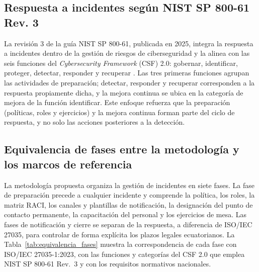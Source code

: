 \subsection{Respuesta a incidentes según NIST SP 800-61 Rev. 3}
La revisión 3 de la guía NIST SP 800-61, publicada en 2025, integra la respuesta a incidentes dentro de la gestión de riesgos de ciberseguridad y la alinea con las seis funciones del \textit{Cybersecurity Framework} (CSF) 2.0: gobernar, identificar, proteger, detectar, responder y recuperar \cite{nist80061r3,nistcsf2024}. Las tres primeras funciones agrupan las actividades de preparación; detectar, responder y recuperar corresponden a la respuesta propiamente dicha, y la mejora continua se ubica en la categoría de mejora de la función identificar. Este enfoque refuerza que la preparación (políticas, roles y ejercicios) y la mejora continua forman parte del ciclo de respuesta, y no solo las acciones posteriores a la detección.

\subsection{Equivalencia de fases entre la metodología y los marcos de referencia}
La metodología propuesta organiza la gestión de incidentes en siete fases. La fase de preparación precede a cualquier incidente y comprende la política, los roles, la matriz RACI, los canales y plantillas de notificación, la designación del punto de contacto permanente, la capacitación del personal y los ejercicios de mesa. Las fases de notificación y cierre se separan de la respuesta, a diferencia de ISO/IEC 27035, para controlar de forma explícita los plazos legales ecuatorianos. La Tabla~\ref{tab:equivalencia_fases} muestra la correspondencia de cada fase con ISO/IEC 27035-1:2023, con las funciones y categorías del CSF 2.0 que emplea NIST SP 800-61 Rev.~3 y con los requisitos normativos nacionales.

